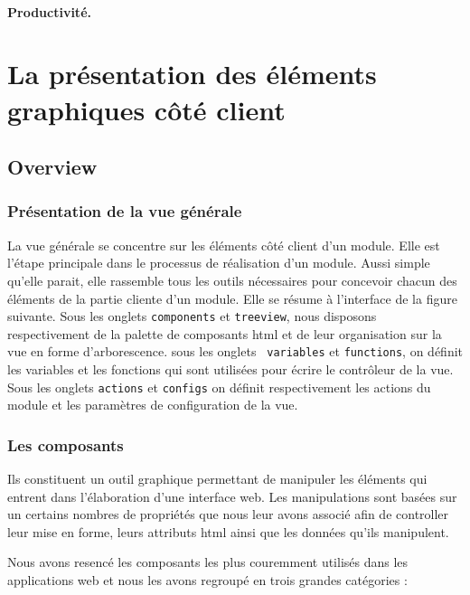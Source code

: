 \documentclass[a4paper,11pt]{report}
\begin{document}
\paragraph{Productivité.}


\section{La présentation des éléments graphiques côté client}
\subsection{Overview}

\subsubsection{Présentation de la vue générale}
La vue générale se concentre sur les éléments côté client d'un
module. Elle est l'étape principale dans le processus de réalisation
d'un module. Aussi simple qu'elle parait, elle rassemble tous les
outils nécessaires pour concevoir chacun des éléments de la partie
cliente d'un module. Elle se résume à l'interface de la figure
suivante. Sous les onglets {\tt components} et {\tt treeview}, nous
disposons respectivement de la palette de composants html et de leur
organisation sur la vue en forme d'arborescence. sous les onglets {\tt
variables} et {\tt functions}, on définit les variables et les
fonctions qui sont utilisées pour écrire le contrôleur de la vue. Sous
les onglets {\tt actions} et {\tt configs} on définit respectivement
les actions du module et les paramètres de configuration de la vue. 


\subsubsection{ Les composants} %
Ils constituent un outil graphique permettant de manipuler les
éléments qui entrent dans l'élaboration d'une interface web. Les
manipulations sont basées sur un certains nombres de propriétés que 
nous leur avons associé afin de controller leur mise en forme, leurs
attributs html ainsi que les données qu'ils manipulent.

Nous avons resencé les composants les plus couremment utilisés dans les
applications web et nous les avons regroupé en trois grandes
catégories :
\end{document}
